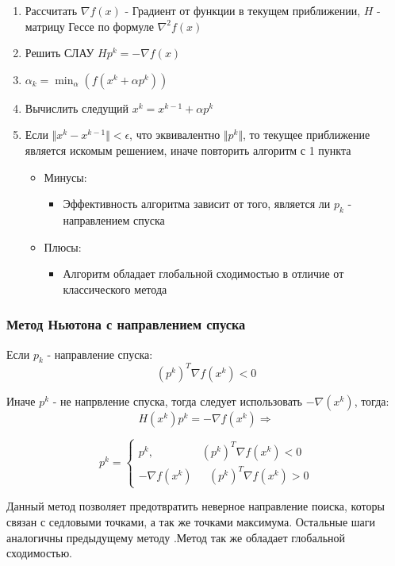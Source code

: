 \documentclass[a4paper, 14pt]{article}
\begin{document}
		 \begin{enumerate}
		\item Рассчитать $\nabla f(x)$ - Градиент от функции в текущем приближении, $H$ - матрицу Гессе по формуле $\nabla^2 f(x)$
		\item Решить СЛАУ $Hp^k = - \nabla f(x)$
		\item $\alpha_k = \min_\alpha(f(x^k + \alpha p^k)) $
		\item Вычислить следущий $x^k = x^{k-1} + \alpha p^k$
		\item Если $\Vert x^k - x^{k-1} \Vert < \epsilon$, что эквивалентно $\Vert p^k \Vert$, то текущее приближение является искомым решением, иначе повторить алгоритм с 1 пункта
		\begin{itemize}
		\item Минусы:
		\begin{itemize}
			\item Эффективность алгоритма зависит от того, является ли $p_k$ - направлением спуска
		\end{itemize}
		\item Плюсы:
		\begin{itemize}
			\item Алгоритм обладает глобальной сходимостью в отличие от классического метода
		\end{itemize}
		
\end{itemize}		  
	\end{enumerate}
		 
		 	\subsubsection*{Метод Ньютона с направлением спуска}
	 Если  $p_k$ - направление спуска:
	 \[
	 (p^k)^T \nabla f(x^k) < 0\]
	 
	 Иначе $p^k$ - не напрвление спуска, тогда следует использовать 
	 $- \nabla(x^k)$, тогда:
	 \[
	 H(x^k)p^k = - \nabla f(x^k) \Rightarrow\]
	 
	 \begin{equation*}
p^k = 
 \begin{cases}
   p^k, &\text{$(p^k)^T \nabla f(x^k) < 0$}\\
   - \nabla f(x^k) &\text{ $(p^k)^T \nabla f(x^k) > 0 $}
 \end{cases}
\end{equation*}

Данный метод позволяет предотвратить неверное направление поиска, которы связан с седловыми точками, а так же точками максимума.
Остальные шаги аналогичны предыдущему методу
.Метод так же обладает глобальной сходимостью.
\end{document}
